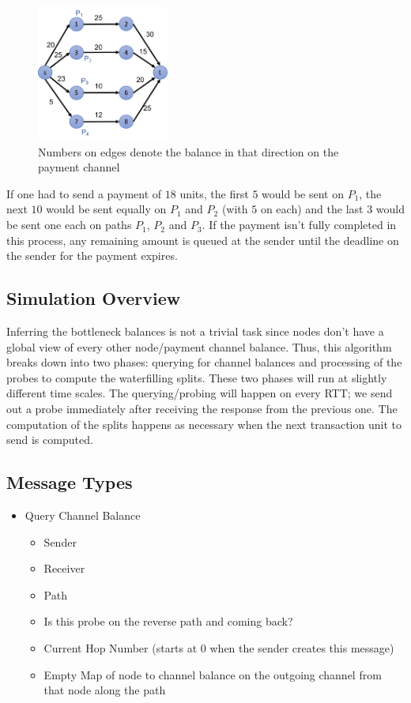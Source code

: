 \documentclass[a4paper]{article}
\newcommand{\TU}{transaction unit\xspace}
\begin{document}
\begin{figure}
\includegraphics[height=4.5cm]{sample_graph.pdf}
\caption{Numbers on edges denote the balance in that direction on the payment channel}
\label{fig:sample_graph}
\end{figure}

If one had to send a payment of $18$ units, the first $5$ would be sent on $P_1$, the next $10$ would be sent equally on $P_1$ and $P_2$ (with $5$ on each) and the
last $3$ would be sent one each on paths $P_1$, $P_2$ and $P_3$. If the payment isn't fully completed in this process, any remaining amount is queued at the sender
until the deadline on the sender for the payment expires.

\subsection{Simulation Overview}
Inferring the bottleneck balances is not a trivial task since nodes don't have a global view of every other node/payment channel balance. Thus, this algorithm
breaks down into two phases: querying for channel balances and processing of the probes to compute the waterfilling splits. These two phases will run at slightly
different time scales. The querying/probing will happen on every RTT; we send out a probe immediately after receiving the response from the previous one. The 
computation of the splits happens as necessary when the next \TU to send is computed.

\subsection{Message Types}
\begin{itemize}
    \item Query Channel Balance
        \begin{itemize}
            \item Sender
            \item Receiver
            \item Path 
            \item Is this probe on the reverse path and coming back?
            \item Current Hop Number (starts at 0 when the sender creates this message)
            \item Empty Map of node to channel balance on the outgoing channel from that node along the path
        \end{itemize}
\end{itemize}
\end{document}
